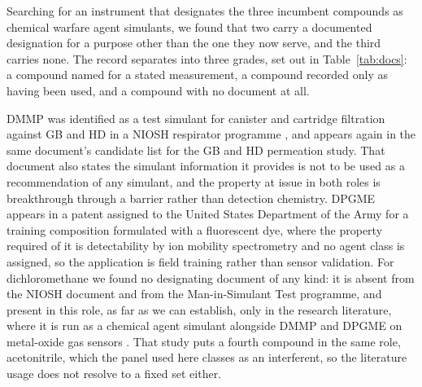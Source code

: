 \documentclass[1p,times]{elsarticle}
\begin{document}
Searching for an instrument that designates the three incumbent compounds as
chemical warfare agent simulants, we found that two carry a documented
designation for a purpose other than the one they now serve, and the third
carries none. The record separates into three grades, set out in
Table~\ref{tab:docs}: a compound named for a stated measurement, a compound
recorded only as having been used, and a compound with no document at all.

DMMP was identified as a test simulant for canister and cartridge filtration
against GB and HD in a NIOSH respirator programme \cite{niosh2002simulant}, and
appears again in the same document's candidate list for the GB and HD permeation
study. That document also states the simulant information it provides is not to
be used
as a recommendation of any simulant, and the property at issue in both roles is
breakthrough through a barrier rather than detection chemistry. %
DPGME appears in a patent assigned to the United States
Department of the Army\cite{seitzinger2006simulant} for a training composition
formulated with a fluorescent dye, where the property required of it is
detectability by ion mobility spectrometry and no agent class is assigned, so
the application is field training rather than sensor validation. For dichloromethane we found no
designating document of any kind: it is absent from the NIOSH document and
from the Man-in-Simulant Test programme, and present in this role, as far as we
can establish, only in the research literature, where it is run as a chemical
agent simulant alongside DMMP and DPGME on metal-oxide gas sensors
\cite{lee2011sno2}. That study puts a fourth compound in the same role,
acetonitrile, which the panel used here classes as an interferent, so the
literature usage does not resolve to a fixed set either.
\end{document}
